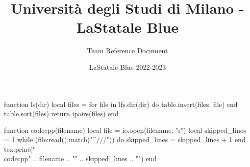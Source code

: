 \documentclass[8pt,a4paper,landscape,oneside]{amsart}
\author{LaStatale Blue 2022-2023}
\title{Università degli Studi di Milano - LaStatale Blue}
\subtitle{Team Reference Document}
\date{\ddmmyyyydate{\today{}}}
\newcommand{\codecpp}[2]{\inputminted[firstline=#2]{cpp}{'\detokenize{#1}'}}
\begin{document}
\begin{multicols*}{3}
\maketitle
\thispagestyle{fancy}
\vspace{-3em}
\renewcommand{\baselinestretch}{0.91}\normalsize
{}
{\small\tableofcontents}
\vspace{-3em}
\begin{luacode*}

function ls(dir)
    local files = {}
    for file in lfs.dir(dir) do
        table.insert(files, file)
    end
    table.sort(files)
    return ipairs(files)
end

function codecpp(filename)
    local file = io.open(filename, "r")
    local skipped_lines = 1
    while (file:read():match("^///")) do
        skipped_lines = skipped_lines + 1
    end
    tex.print("\\codecpp{" .. filename .. "}{" .. skipped_lines .. "}")
end


\end{luacode*}
\end{multicols*}
\end{document}
